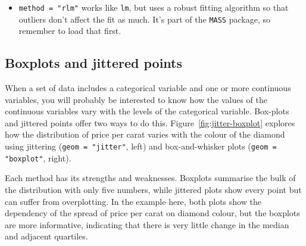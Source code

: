 \begin{itemize}
    

  \item {\tt method = "rlm"} works like {\tt lm}, but uses a robust fitting algorithm so that outliers don't affect the fit as much.  It's part of the {\tt MASS} package, so remember to load that first.

\end{itemize}

\subsection{Boxplots and jittered points}
\label{sub:boxplot}

When a set of data includes a categorical variable and one or more continuous variables, you will probably be interested to know how the values of the continuous variables vary with the levels of the categorical variable.  Box-plots and jittered points offer two ways to do this.  Figure~\ref{fig:jitter-boxplot} explores how the distribution of price per carat varies with the colour of the diamond using jittering ({\tt geom = "jitter"}, left) and box-and-whisker plots ({\tt geom = "boxplot"}, right).

% 


Each method has its strengths and weaknesses. Boxplots summarise the bulk of the distribution with only five numbers, while jittered plots show every point but can suffer from overplotting. In the example here, both plots show the dependency of the spread of price per carat on diamond colour, but the boxplots are more informative, indicating that there is very little change in the median and adjacent quartiles.

